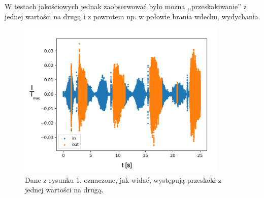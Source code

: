 \documentclass[polish]{article}
\begin{document}
W testach jakościowych jednak zaobserwować było można ,,przeskakiwanie'' z jednej
wartości na drugą i z powrotem np. w połowie brania wdechu, wydychania.
\begin{figure}[H]
	\centering
	\includegraphics[width=10cm]{przeskakiwanie_ozn}
  	\caption{Dane z rysunku 1. oznaczone, jak widać, występują przeskoki z jednej wartości na drugą.}
\end{figure}
\end{document}
